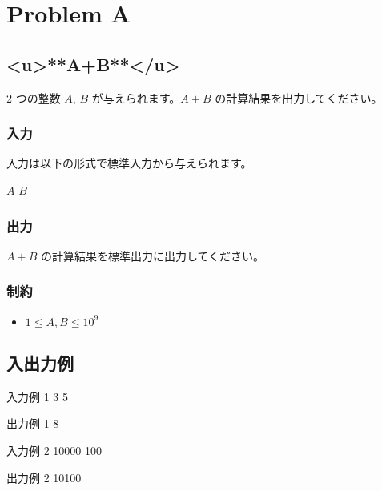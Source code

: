 \documentclass[11pt,a4paper]{article}
\begin{document}
\section{Problem A}

\subsection{<u>**A+B**</u>}

2 つの整数 $A$, $B$ が与えられます。$A + B$ の計算結果を出力してください。

\subsubsection{入力}

入力は以下の形式で標準入力から与えられます。

\begin{screen}
$A$ $B$
\end{screen}

\subsubsection{出力}

$A + B$ の計算結果を標準出力に出力してください。

\subsubsection{制約}

\begin{itemize}
    \item $1 \leq A, B \leq 10^{9}$
\end{itemize}



\subsection{ 入出力例 }



\begin{itembox}[l]{ 入力例 1 }
3 5

\end{itembox}



\begin{itembox}[l]{ 出力例 1 }
8

\end{itembox}







\begin{itembox}[l]{ 入力例 2 }
10000 100

\end{itembox}



\begin{itembox}[l]{ 出力例 2 }
10100

\end{itembox}
\end{document}
